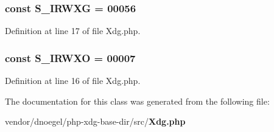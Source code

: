 \subsubsection[{S\+\_\+\+I\+R\+W\+X\+G}]{\setlength{\rightskip}{0pt plus 5cm}const S\+\_\+\+I\+R\+W\+X\+G = 00056}\label{class_xdg_base_dir_1_1_xdg_aeb35285c7781b7afb13ea56d7dc84f98}


Definition at line 17 of file Xdg.\+php.

\subsubsection[{S\+\_\+\+I\+R\+W\+X\+O}]{\setlength{\rightskip}{0pt plus 5cm}const S\+\_\+\+I\+R\+W\+X\+O = 00007}\label{class_xdg_base_dir_1_1_xdg_a0a264921f8dcb65e525918ff7cdcfba0}


Definition at line 16 of file Xdg.\+php.



The documentation for this class was generated from the following file\+:\begin{DoxyCompactItemize}
\item 
vendor/dnoegel/php-\/xdg-\/base-\/dir/src/{\bf Xdg.\+php}\end{DoxyCompactItemize}
